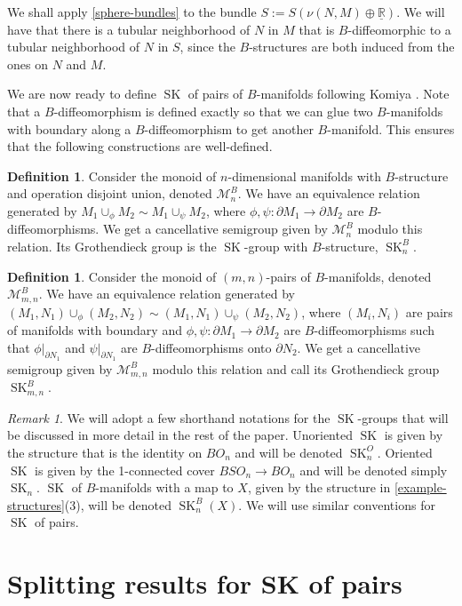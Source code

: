 \documentclass{amsart}
\theoremstyle{definition}
\newtheorem{defi}[thm]{Definition}
\theoremstyle{remark}
\newtheorem*{rmk}{Remark}
\newcommand{\R}{\mathbb{R}}
\newcommand{\de}{\partial}
\newcommand{\SK}{\operatorname{SK}}
\begin{document}
We shall apply \cref{sphere-bundles} to the bundle $S:=S(\nu(N,M)\oplus \underline{\R})$. We will have that there is a tubular neighborhood of $N$ in $M$ that is $B$-diffeomorphic to a tubular neighborhood of $N$ in $S$, since the $B$-structures are both induced from the ones on $N$ and $M$.

We are now ready to define $\SK$ of pairs of $B$-manifolds following Komiya \cite{komiya1986}. Note that a $B$-diffeomorphism is defined exactly so that we can glue two $B$-manifolds with boundary along a $B$-diffeomorphism to get another $B$-manifold. This ensures that the following constructions are well-defined.

\begin{defi}
    Consider the monoid of $n$-dimensional manifolds with $B$-structure and operation disjoint union, denoted $\mathcal{M}_n^B$. We have an equivalence relation generated by $M_1 \cup_\phi M_2 \sim M_1 \cup_\psi M_2$, where $\phi,\psi:\de M_1\to \de M_2$ are $B$-diffeomorphisms. We get a cancellative semigroup given by $\mathcal{M}_n^B$ modulo this relation. Its Grothendieck group is the $\SK$-group with $B$-structure, $\SK_n^B$. 
\end{defi}

\begin{defi}
    Consider the monoid of $(m,n)$-pairs of $B$-manifolds, denoted $\mathcal{M}_{m,n}^B$. We have an equivalence relation generated by $(M_1,N_1) \cup_\phi (M_2,N_2) \sim (M_1,N_1) \cup_\psi (M_2,N_2)$, where $(M_i,N_i)$ are pairs of manifolds with boundary and $\phi,\psi: \de M_1\to \de M_2$ are $B$-diffeomorphisms such that $\phi|_{\de N_1}$ and $\psi|_{\de N_1}$ are $B$-diffeomorphisms onto $\de N_2$. We get a cancellative semigroup given by $\mathcal{M}_{m,n}^B$ modulo this relation and call its Grothendieck group $\SK_{m,n}^B$.
\end{defi}

\begin{rmk}
    We will adopt a few shorthand notations for the $\SK$-groups that will be discussed in more detail in the rest of the paper. Unoriented $\SK$ is given by the structure that is the identity on $BO_n$ and will be denoted $\SK_n^O$. Oriented $\SK$ is given by the 1-connected cover $BSO_n\to BO_n$ and will be denoted simply $\SK_n$. $\SK$ of $B$-manifolds with a map to $X$, given by the structure in \cref{example-structures}(3), will be denoted $\SK_n^B(X)$. We will use similar conventions for $\SK$ of pairs.
\end{rmk}
\section{Splitting results for SK of pairs}\label{results}
\end{document}
